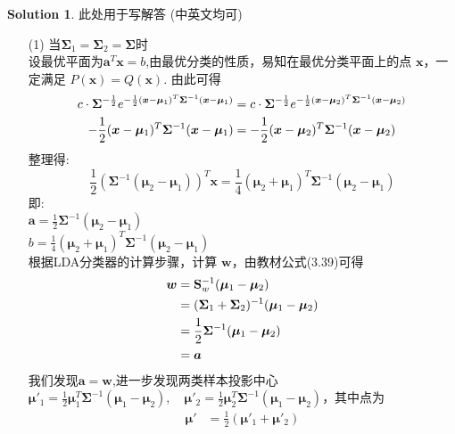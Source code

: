 \documentclass[a4paper,UTF8]{article}
\numberwithin{equation}{section}
\theoremstyle{definition}
\newtheorem*{solution}{Solution}
\newcommand{\bds}{\boldsymbol}
\begin{document}
\begin{solution}
	此处用于写解答 (中英文均可)
	\begin{itemize}
		\item[(1)] 当$\bds{\Sigma}_1=\bds{\Sigma}_2=\bds{\Sigma}$时 \\
		设最优平面为$\bds{a}^T\bds{x}=b$,由最优分类的性质，易知在最优分类平面上的点 $\bds{x}$，一定满足 $P(\bds{x}) = Q(\bds{x})$. 由此可得
		\begin{equation}
			\begin{split}
				c\cdot \bds{\Sigma}^{-\frac{1}{2}}e^{-\frac{1}{2}(\bds{x} - \bds{\mu}_1)^T\bds{\Sigma}^{-1}(\bds{x}-\bds{\mu}_1)} &= c\cdot \bds{\Sigma}^{-\frac{1}{2}}e^{-\frac{1}{2}(\bds{x} - \bds{\mu}_2)^T\bds{\Sigma}^{-1}(\bds{x}-\bds{\mu}_2)} \\
				-\frac{1}{2}(\bds{x} - \bds{\mu}_1)^T\bds{\Sigma}^{-1}(\bds{x}-\bds{\mu}_1) &= -\frac{1}{2}(\bds{x} - \bds{\mu}_2)^T\bds{\Sigma}^{-1}(\bds{x}-\bds{\mu}_2) \\
			\end{split}
			\notag
		\end{equation}
		整理得:
		$$
		\frac{1}{2}(\bds{\Sigma}^{-1}(\bds{\mu}_2-\bds{\mu}_1))^T \bds{x} = \frac{1}{4}(\bds{\mu}_2+\bds{\mu}_1)^T\bds{\Sigma}^{-1}(\bds{\mu}_2-\bds{\mu}_1) 
		$$
		即:\\$\bds{a}=\frac{1}{2}\bds{\Sigma}^{-1}(\bds{\mu}_2-\bds{\mu}_1)$\\
		$b=\frac{1}{4}(\bds{\mu}_2+\bds{\mu}_1)^T\bds{\Sigma}^{-1}(\bds{\mu}_2-\bds{\mu}_1)$\\
		根据LDA分类器的计算步骤，计算 $\bds{w}$，由教材公式(3.39)可得
		\begin{equation}
			\begin{split}
				\bds{w} &= \mathbf{S}_{w}^{-1}(\bds{\mu}_1-\bds{\mu}_2) \\
				&= (\bds{\Sigma}_1+\bds{\Sigma}_2)^{-1}(\bds{\mu}_1-\bds{\mu}_2) \\
				&= \frac{1}{2}\bds{\Sigma}^{-1}(\bds{\mu}_1-\bds{\mu}_2)\\
				&= \bds{a}
			\end{split}
			\notag
		\end{equation}
		我们发现$\bds{a}=\bds{w}$,进一步发现两类样本投影中心 $\bds{\mu}'_1 = \frac{1}{2}\bds{\mu}_1^T\bds{\Sigma}^{-1}(\bds{\mu}_1-\bds{\mu}_2), \quad \bds{\mu}'_2 = \frac{1}{2}\bds{\mu}_2^T\bds{\Sigma}^{-1}(\bds{\mu}_1-\bds{\mu}_2)$，其中点为
		\begin{equation}
			\begin{split}
				\bds{\mu}' &= \frac{1}{2}(\bds{\mu}'_1+\bds{\mu}'_2) \\

\end{split}
\end{equation}
\end{itemize}
\end{solution}
\end{document}
